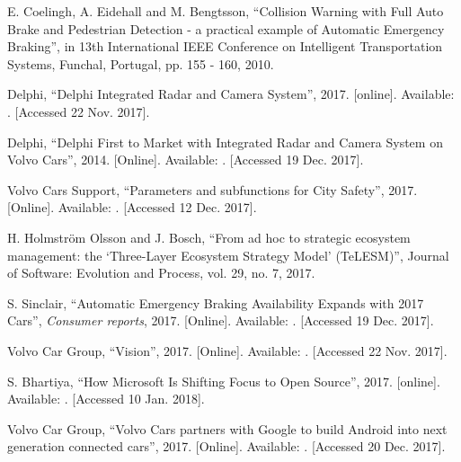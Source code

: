 \documentclass[conference]{IEEEtran}
\begin{document}
\begin{thebibliography}{00}
	E. Coelingh, A. Eidehall and M. Bengtsson,
	``Collision Warning with Full Auto Brake and Pedestrian Detection - a practical example of Automatic Emergency Braking'',
	in 13th International IEEE Conference on Intelligent Transportation Systems, 
	Funchal, Portugal,
	pp. 155 - 160,
	2010.
	
	Delphi,
	``Delphi Integrated Radar and Camera System'',
	2017.
	[online]. Available: .
	[Accessed 22 Nov. 2017].
	
	Delphi,
	``Delphi First to Market with Integrated Radar and Camera System on Volvo Cars'',
	2014.
	[Online]. Available: .
	[Accessed 19 Dec. 2017].
	
	Volvo Cars Support,
	``Parameters and subfunctions for City Safety'',
	2017.
	[Online]. Available: 
	.
	[Accessed 12 Dec. 2017].
	
	H. Holmstr\"{o}m Olsson and J. Bosch,
	``From ad hoc to strategic ecosystem management: the `Three-Layer Ecosystem Strategy Model' (TeLESM)'',
	Journal of Software: Evolution and Process,
	vol. 29, no. 7, 
	2017.
	
	S. Sinclair,
	``Automatic Emergency Braking Availability Expands with 2017 Cars'',
	\emph{Consumer reports},
	2017.
	[Online]. Available:
	.
	[Accessed 19 Dec. 2017].
	
	Volvo Car Group,
	``Vision'',
	2017.
	[Online]. Available: 
	. 
	[Accessed 22 Nov. 2017].
	
	S. Bhartiya,
	``How Microsoft Is Shifting Focus to Open Source'',
	2017.
	[online]. Available:
	.
	[Accessed 10 Jan. 2018].
	
	Volvo Car Group,
	``Volvo Cars partners with Google to build Android into next generation connected cars'',
	2017.
	[Online]. Available:
	.
	[Accessed 20 Dec. 2017].
	

\end{thebibliography}
\end{document}

